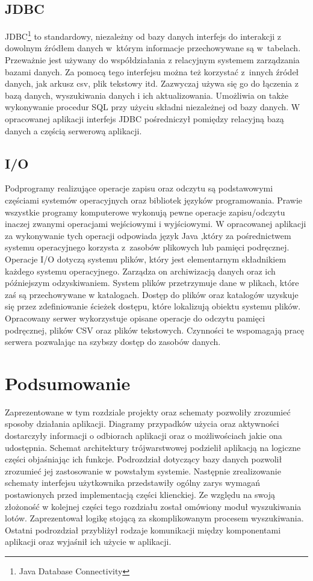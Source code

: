 \documentclass[12pt, twoside]{report}
\begin{document}
\subsection{JDBC}
JDBC\footnote{Java Database Connectivity} to standardowy, niezależny od bazy danych interfejs do interakcji z dowolnym źródłem danych w~którym informacje przechowywane są w~tabelach. Przeważnie jest używany do współdziałania z relacyjnym systemem zarządzania bazami danych. Za pomocą tego interfejsu można też korzystać z~innych źródeł danych, jak arkusz csv, plik tekstowy itd. Zazwyczaj używa się go do łączenia z bazą danych, wyszukiwania danych i ich aktualizowania. Umożliwia on także wykonywanie procedur SQL przy użyciu składni niezależnej od bazy danych\cite{jdbc}. W opracowanej aplikacji interfejs JDBC pośredniczył pomiędzy relacyjną bazą danych a częścią serwerową aplikacji.


\subsection{I/O}
Podprogramy realizujące operacje zapisu oraz odczytu są podstawowymi częściami systemów operacyjnych oraz bibliotek języków programowania. Prawie wszystkie programy komputerowe wykonują pewne operacje zapisu/odczytu inaczej zwanymi operacjami wejściowymi i wyjściowymi. W opracowanej aplikacji za wykonywanie tych operacji odpowiada język Java ,który za pośrednictwem systemu operacyjnego korzysta z~zasobów plikowych lub pamięci podręcznej. Operacje I/O dotyczą systemu plików, który jest elementarnym składnikiem każdego systemu operacyjnego. Zarządza on archiwizacją danych oraz ich późniejszym odzyskiwaniem. System plików przetrzymuje dane w plikach, które zaś są przechowywane w katalogach. Dostęp do plików oraz katalogów uzyskuje się przez zdefiniowanie ścieżek dostępu, które lokalizują obiektu systemu plików.\cite{i/o}
Opracowany serwer wykorzystuje opisane operacje do odczytu pamięci podręcznej, plików CSV oraz plików tekstowych. Czynności te wspomagają pracę serwera pozwalając na szybszy dostęp do zasobów danych.

\section{Podsumowanie}
Zaprezentowane w tym rozdziale projekty oraz schematy pozwoliły zrozumieć sposoby działania aplikacji. Diagramy przypadków użycia oraz aktywności dostarczyły informacji o odbiorach aplikacji oraz o możliwościach jakie ona udostępnia. Schemat architektury trójwarstwowej podzielił aplikacją na logiczne części objaśniając ich funkcje. Podrozdział dotyczący bazy danych pozwolił zrozumieć jej zastosowanie w powstałym systemie. Następnie zrealizowanie schematy interfejsu użytkownika przedstawiły ogólny zarys wymagań postawionych przed implementacją części klienckiej. Ze względu na swoją złożoność w kolejnej części tego rozdziału został omówiony moduł wyszukiwania lotów. Zaprezentował logikę stojącą za skomplikowanym procesem wyszukiwania. Ostatni podrozdział przybliżył rodzaje komunikacji między komponentami aplikacji oraz wyjaśnił ich użycie w aplikacji.
\end{document}
